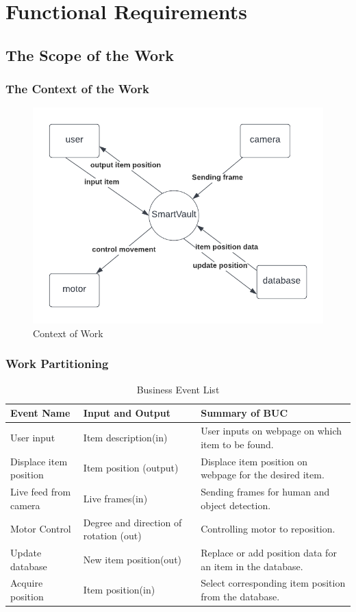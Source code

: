 \documentclass[12pt]{article}
\begin{document}
\section{Functional Requirements}


\subsection{The Scope of the Work}

\subsubsection{The Context of the Work}
\begin{figure}[H]
    \centering
    \includegraphics[scale=0.7]{work_context.png}
    \caption{Context of Work}
\end{figure}
\subsubsection{Work Partitioning}

\begin{table}[H]
\caption{Business Event List} 
\begin{tabularx}{\textwidth}{XXX}
\toprule
\textbf{Event Name} & \textbf{Input and Output} & \textbf{Summary of BUC}\\
\midrule
User input & Item description(in) & User inputs on webpage on which item to be found.\\
Displace item position & Item position (output) & Displace item position on webpage for the desired item.\\
Live feed from camera & Live frames(in) & Sending frames for human and object detection.\\
Motor Control& Degree and direction of rotation (out) & Controlling motor to reposition.\\
Update database & New item position(out) & Replace or add position data for an item in the database.\\
Acquire position & Item position(in) & Select corresponding item position from the database.\\

\bottomrule
\end{tabularx}
\end{table}
\end{document}
